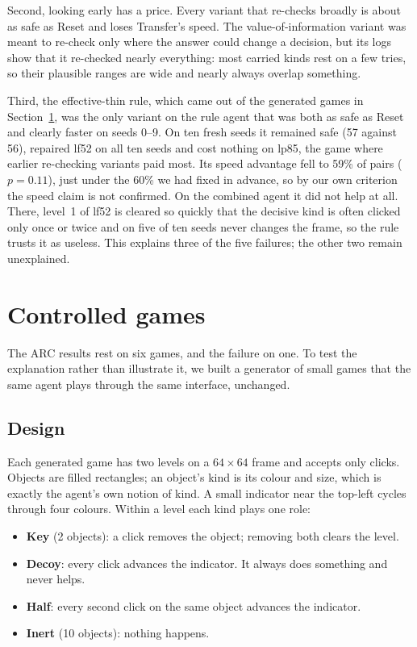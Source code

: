 \documentclass[11pt,a4paper]{article}
\begin{document}
Second, looking early has a price. Every variant that re-checks broadly is about as safe as Reset and loses Transfer's speed. The value-of-information variant was meant to re-check only where the answer could change a decision, but its logs show that it re-checked nearly everything: most carried kinds rest on a few tries, so their plausible ranges are wide and nearly always overlap something.

Third, the effective-thin rule, which came out of the generated games in Section~\ref{sec:generated}, was the only variant on the rule agent that was both as safe as Reset and clearly faster on seeds 0--9. On ten fresh seeds it remained safe (57 against 56), repaired lf52 on all ten seeds and cost nothing on lp85, the game where earlier re-checking variants paid most. Its speed advantage fell to 59\% of pairs ($p = 0.11$), just under the 60\% we had fixed in advance, so by our own criterion the speed claim is not confirmed. On the combined agent it did not help at all. There, level~1 of lf52 is cleared so quickly that the decisive kind is often clicked only once or twice and on five of ten seeds never changes the frame, so the rule trusts it as useless. This explains three of the five failures; the other two remain unexplained.

\section{Controlled games}
\label{sec:generated}

The ARC results rest on six games, and the failure on one. To test the explanation rather than illustrate it, we built a generator of small games that the same agent plays through the same interface, unchanged.

\subsection{Design}
\label{sec:gendesign}

Each generated game has two levels on a $64 \times 64$ frame and accepts only clicks. Objects are filled rectangles; an object's kind is its colour and size, which is exactly the agent's own notion of kind. A small indicator near the top-left cycles through four colours. Within a level each kind plays one role:
\begin{itemize}
  \item \textbf{Key} (2 objects): a click removes the object; removing both clears the level.
  \item \textbf{Decoy}: every click advances the indicator. It always does something and never helps.
  \item \textbf{Half}: every second click on the same object advances the indicator.
  \item \textbf{Inert} (10 objects): nothing happens.
\end{itemize}
\end{document}
